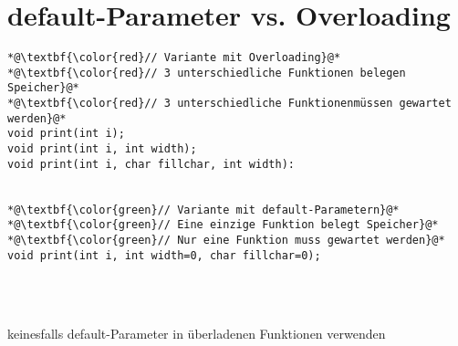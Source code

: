 \section{default-Parameter vs. Overloading}
\label{sec:default-Parameter vs. Overloading}
\noindent
\begin{minipage}{\linewidth}
\begin{lstlisting}
*@\textbf{\color{red}// Variante mit Overloading}@*
*@\textbf{\color{red}// 3 unterschiedliche Funktionen belegen Speicher}@*
*@\textbf{\color{red}// 3 unterschiedliche Funktionenmüssen gewartet werden}@*
void print(int i);
void print(int i, int width);
void print(int i, char fillchar, int width):
	
	
*@\textbf{\color{green}// Variante mit default-Parametern}@*
*@\textbf{\color{green}// Eine einzige Funktion belegt Speicher}@*
*@\textbf{\color{green}// Nur eine Funktion muss gewartet werden}@*
void print(int i, int width=0, char fillchar=0);	
\end{lstlisting}
\end{minipage}
\\
\\
\begin{achtung}
keinesfalls default-Parameter in überladenen Funktionen verwenden
\end{achtung}


 